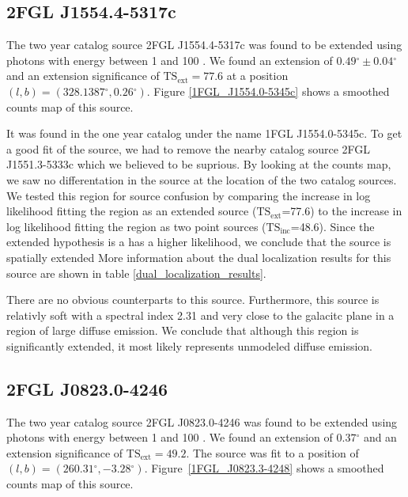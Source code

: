 \documentclass[12pt,preprint]{aastex}
\newcommand{\gev}{\text{GeV}\xspace}
\newcommand{\tsext}{{\ensuremath{\text{TS}_\text{ext}}}\xspace}
\newcommand{\tsinc}{\ensuremath{\text{TS}_\text{inc}}\xspace}
\renewcommand{\deg}{\ensuremath{^\circ}\xspace}
\begin{document}
\subsection{2FGL J1554.4-5317c}


The two year catalog source 2FGL J1554.4-5317c was found to be
extended using photons with energy between 1 \gev and 100 \gev.
We found an extension of $0.49\deg\pm 0.04\deg$ and an extension significance of
$\tsext=77.6$ at a position $(l,b)=(328.1387\deg,0.26\deg)$.  Figure
\ref{1FGL_J1554.0-5345c} shows a smoothed counts map of this source.

It was found in the one year catalog under the name 1FGL J1554.0-5345c.
To get a good fit of the source, we had to remove the nearby catalog
source 2FGL J1551.3-5333c
which we believed to be suprious. By looking at
the counts map, we saw no differentation in the source at the location
of the two catalog sources. We tested this region for source confusion
by comparing the increase in log likelihood fitting the region as an
extended source (\tsext=77.6) to the increase in log likelihood fitting
the region as two point sources (\tsinc=48.6).  Since the extended
hypothesis is a has a higher likelihood, we conclude that the source is
spatially extended More
information about the dual localization results for this source are
shown in table \ref{dual_localization_results}.

There are no obvious counterparts to this source. Furthermore, this
source is relativly soft with a spectral index 2.31 and
very close to the galacitc plane in a region of large diffuse emission.
We conclude that although this region is significantly extended, it most
likely represents unmodeled diffuse emission.


\subsection{2FGL J0823.0-4246}


The two year catalog source 2FGL J0823.0-4246 was found to be
extended using photons with energy between 1 \gev and 100 \gev.
We found an extension of $0.37\deg$ and an extension
significance of $\tsext=49.2$.  The source was fit to a position of
$(l,b)=(260.31\deg,-3.28\deg)$.  Figure~\ref{1FGL_J0823.3-4248} shows
a smoothed counts map of this source.
\end{document}
